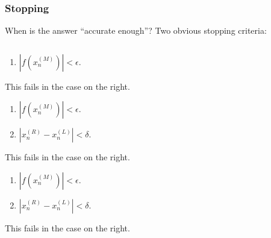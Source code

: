 \documentclass{beamer}
\begin{document}
\begin{frame}
  \frametitle{Stopping}

  When is the answer ``accurate enough''? \pause Two obvious
  stopping criteria:

  \vspace{2ex}

  \begin{columns}
    \begin{column}{0.5\textwidth}
      \begin{overlayarea}{\textwidth}{0.6\textheight}
        {
          \begin{enumerate}
          \item $|f(x_n^{(M)})| < \epsilon$.
          \end{enumerate}

          \vspace{2ex}

          This fails in the case on the right.
        }
        {
          \begin{enumerate}
          \item $|f(x_n^{(M)})| < \epsilon$.
          \item $|x_n^{(R)} - x_n^{(L)}| < \delta$.
          \end{enumerate}


          \vspace{2ex}

          This fails in the case on the right.
        }
        {
          \begin{enumerate}
          \item $|f(x_n^{(M)})| < \epsilon$.
          \item $|x_n^{(R)} - x_n^{(L)}| < \delta$.
          \end{enumerate}


          \vspace{2ex}

          This fails in the case on the right.

          \vspace{2ex}

}
\end{overlayarea}
\end{column}
\end{columns}
\end{frame}
\end{document}
